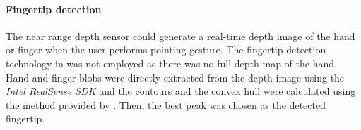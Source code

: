 \paragraph{Fingertip detection}
The near range depth sensor could generate a real-time depth image of the hand or finger when the user performs pointing gesture. The fingertip detection technology in \cite{Betancourt2015} was not employed as there was no full depth map of the hand. Hand and finger blobs were directly extracted from the depth image using the \textit{Intel RealSense SDK} and the contours and the convex hull were calculated using the method provided by \cite{Suzuki1985}. Then, the best peak was chosen as the detected fingertip. 
